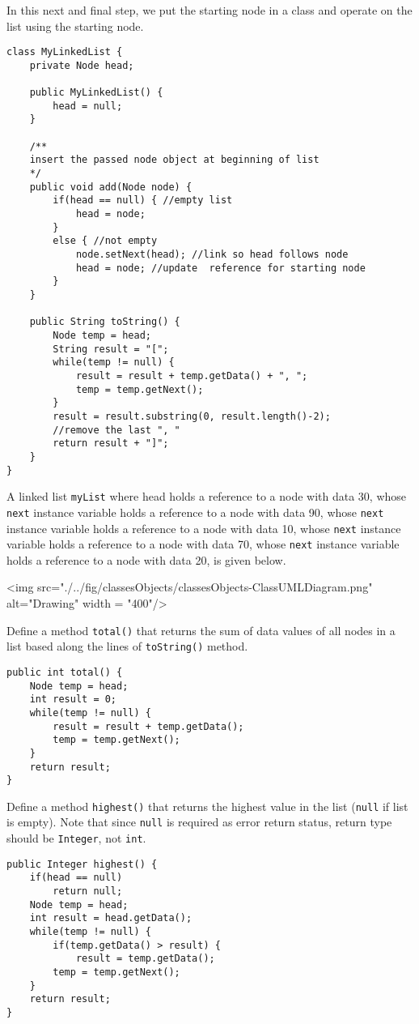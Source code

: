 In this next and final step, we put the starting node in a class and operate on the list using the starting node.

\begin{lstlisting}[linewidth=15.5cm]
class MyLinkedList {
	private Node head;
	
	public MyLinkedList() {
		head = null;
	}
	
	/**
	insert the passed node object at beginning of list
	*/
	public void add(Node node) {
		if(head == null) { //empty list
			head = node; 
		}
		else { //not empty
			node.setNext(head); //link so head follows node
			head = node; //update  reference for starting node
		}
	}
	
	public String toString() {
		Node temp = head;
		String result = "[";
		while(temp != null) {
			result = result + temp.getData() + ", ";
			temp = temp.getNext();
		}
		result = result.substring(0, result.length()-2); 
		//remove the last ", "
		return result + "]";
	}
}
\end{lstlisting}

A linked list \texttt{myList} where head holds a reference to a node with data 30, whose \texttt{next} instance variable holds a reference to a node with data 90, whose \texttt{next} instance variable holds a reference to a node with data 10, whose \texttt{next} instance variable holds a reference to a node with data 70, whose \texttt{next} instance variable holds a reference to a node with data 20, is given below.

\vskip 0.5cm

<img src="./../fig/classesObjects/classesObjects-ClassUMLDiagram.png" alt="Drawing" width = "400"/>

\begin{exercise}[5]
Define a method \texttt{total()} that returns the sum of data values of all nodes in a list based along the lines of \texttt{toString()} method.	
\end{exercise}
\begin{answer}
\begin{lstlisting}
public int total() {
	Node temp = head;
	int result = 0;
	while(temp != null) {
		result = result + temp.getData();
		temp = temp.getNext();
	}
	return result;
}
\end{lstlisting}	
\end{answer}

\begin{exercise}[8]
Define a method \texttt{highest()} that returns the highest value in the list (\texttt{null} if list is empty). Note that since \texttt{null} is required as error return status, return type should be \texttt{Integer}, not \texttt{int}.
\end{exercise}
\begin{answer}
\begin{lstlisting}
public Integer highest() {
	if(head == null)
		return null;
	Node temp = head;
	int result = head.getData();
	while(temp != null) {
		if(temp.getData() > result) {
			result = temp.getData();
		temp = temp.getNext();
	}
	return result;
}
\end{lstlisting}	
\end{answer}

